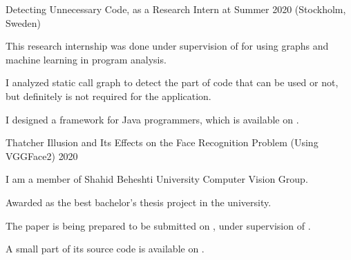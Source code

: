 

\begin{cvprojects}

  \cvproject
    {Detecting Unnecessary Code, as a Research Intern at }
    {}
    {}
    {Summer 2020 (Stockholm, Sweden)}
    {
      \begin{cvitems} %
        \item {This research internship was done under supervision of  for using graphs and machine learning in program analysis.}
        \item {I analyzed static call graph to detect the part of code that can be used or not, but definitely is not required for the application.}
        \item {I designed a framework for Java programmers, which is available on .}
      \end{cvitems}
    }

  \cvproject
    {Thatcher Illusion and Its Effects on the Face Recognition Problem (Using VGGFace2)} %
    {} %
    {} %
    {2020} %
    {
      \begin{cvitems} %
        \item {I am a member of Shahid Beheshti University Computer Vision Group.}
        \item {Awarded as the best bachelor's thesis project in the university.}
        \item {The paper is being prepared to be submitted on , under supervision of .}
        \item {A small part of its source code is available on .}
      \end{cvitems}
    }


\end{cvprojects}
